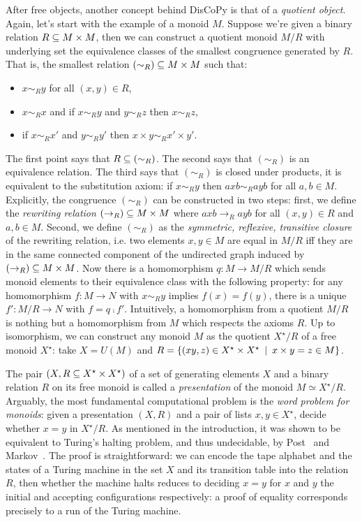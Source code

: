 After free objects, another concept behind DisCoPy is that of a \emph{quotient object}.
Again, let's start with the example of a monoid $M$.
Suppose we're given a binary relation $R \subseteq M \times M$, then we can construct a quotient monoid $M / R$ with underlying set the equivalence classes of the smallest congruence generated by $R$.
That is, the smallest relation $(\sim_R) \subseteq M \times M$ such that:
\begin{itemize}
\item $x \sim_R y$ for all $(x, y) \in R$,
\item $x \sim_R x$ and if $x \sim_R y$ and $y \sim_R z$ then $x \sim_R z$,
\item if $x \sim_R x'$ and $y \sim_R y'$ then $x \times y \sim_R x' \times y'$.
\end{itemize}
The first point says that $R \subseteq (\sim_R)$.
The second says that $(\sim_R)$ is an equivalence relation.
The third says that $(\sim_R)$ is closed under products, it is equivalent to the substitution axiom: if $x \sim_R y$ then $a x b \sim_R a y b$ for all $a, b \in M$.
Explicitly, the congruence $(\sim_R)$ can be constructed in two steps: first, we define the \emph{rewriting relation} $(\to_R) \subseteq M \times M$ where $a x b \to_R a y b$ for all $(x, y) \in R$ and $a, b \in M$.
Second, we define $(\sim_R)$ as the \emph{symmetric, reflexive, transitive closure} of the rewriting relation, i.e. two elements $x, y \in M$ are equal in $M / R$ iff they are in the same connected component of the undirected graph induced by $(\to_R) \subseteq M \times M$.
Now there is a homomorphism $q : M \to M / R$ which sends monoid elements to their equivalence class with the following property: for any homomorphism $f : M \to N$ with $x \sim_R y$ implies $f(x) = f(y)$, there is a unique $f' : M / R \to N$ with $f = q \fcmp f'$.
Intuitively, a homomorphism from a quotient $M / R$ is nothing but a homomorphism from $M$ which respects the axioms $R$.
Up to isomorphism, we can construct any monoid $M$ as the quotient $X^\star / R$ of a free monoid $X^\star$: take $X = U(M)$ and $R = \{ (x y, z) \in X^\star \times X^\star \enspace \vert \enspace x \times y = z \in M \}$.

The pair $(X, R \subseteq X^\star \times X^\star)$ of a set of generating elements $X$ and a binary relation $R$ on its free monoid is called a \emph{presentation} of the monoid $M \simeq X^\star / R$.
Arguably, the most fundamental computational problem is the \emph{word problem for monoids}: given a presentation $(X, R)$ and a pair of lists $x, y \in X^\star$, decide whether $x = y$ in $X^\star / R$.
As mentioned in the introduction, it was shown to be equivalent to Turing's halting problem, and thus undecidable, by Post~\cite{Post47} and Markov~\cite{Markov47}.
The proof is straightforward: we can encode the tape alphabet and the states of a Turing machine in the set $X$ and its transition table into the relation $R$, then whether the machine halts reduces to deciding $x = y$ for $x$ and $y$ the initial and accepting configurations respectively: a proof of equality corresponds precisely to a run of the Turing machine.

